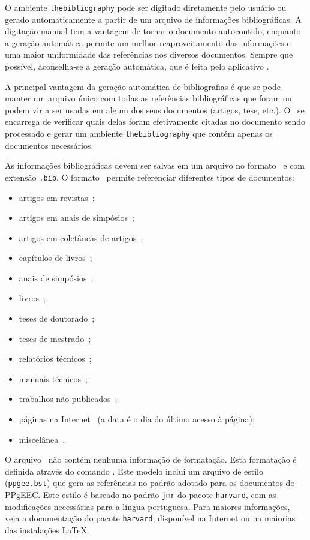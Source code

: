 O ambiente \texttt{thebibliography} pode ser digitado diretamente pelo
usuário ou gerado automaticamente a partir de um arquivo de
informações bibliográficas. A digitação manual tem a vantagem de
tornar o documento autocontido, enquanto a geração automática permite
um melhor reaproveitamento das informações e uma maior uniformidade
das referências nos diversos documentos. Sempre que possível,
aconselha-se a geração automática, que é feita pelo aplicativo
\BibTeX.

A principal vantagem da geração automática de bibliografias é que se
pode manter um arquivo único com todas as referências bibliográficas
que foram ou podem vir a ser usadas em algum dos seus documentos
(artigos, tese, etc.).  O \BibTeX\ se encarrega de verificar quais
delas foram efetivamente citadas no documento sendo processado e gerar
um ambiente \texttt{thebibliography} que contém apenas os documentos
necessários.

As informações bibliográficas devem ser salvas em um arquivo no
formato \BibTeX\ e com extensão \texttt{.bib}. O formato \BibTeX\ 
permite referenciar diferentes tipos de documentos:
\begin{itemize}
\item artigos em revistas~\cite{art-solimaes03};
\item artigos em anais de simpósios~\cite{proc-gates01};
\item artigos em coletâneas de artigos~\cite{col-pinto00};
\item capítulos de livros~\cite{inbook-santos00};
\item anais de simpósios~\cite{proc-sbrc02};
\item livros~\cite{book-lamport94};
\item teses de doutorado~\cite{phd-gates01};
\item teses de mestrado~\cite{msc-santos03};
\item relatórios técnicos~\cite{rep-omg2000};
\item manuais técnicos~\cite{man-orbix99};
\item trabalhos não publicados~\cite{unp-sichman02};
\item páginas na Internet~\cite{hp-novet03} (a data é o dia do
      último acesso à página);
\item miscelânea~\cite{misc-cruz03}.
\end{itemize}

O arquivo \BibTeX\ não contém nenhuma informação de formatação. Esta
formatação é definida através do comando \verb||.
Este modelo inclui um arquivo de estilo (\texttt{ppgee.bst}) que gera
as referências no padrão adotado para os documentos do PPgEEC. Este
estilo é baseado no padrão \texttt{jmr} do pacote \texttt{harvard}, com
as modificações necessárias para a língua portuguesa. Para maiores
informações, veja a documentação do pacote \texttt{harvard}, disponível
na Internet ou na maiorias das instalações \LaTeX.

